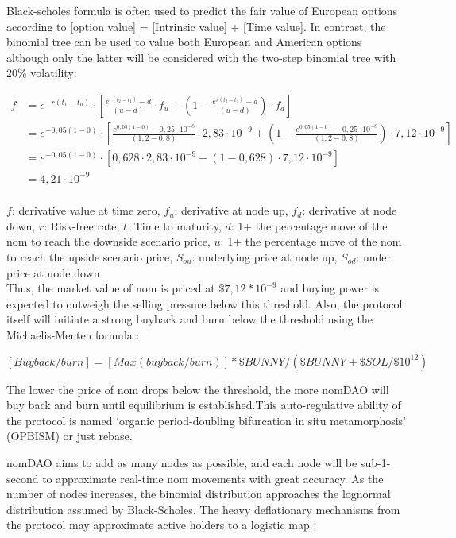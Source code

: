 \documentclass[12pt]{article}
\begin{document}
Black-scholes formula \cite{bscholes} is often used to predict the fair value of European options according to [option value] = [Intrinsic value] + [Time value]. In contrast, the binomial tree can be used to value both European and American options although only the latter will be considered with the two-step binomial tree with 20\% volatility:


\begin{equation}\label{black}
\begin{split}
f &=e^{-r(t_{1} -t_{0})} \cdot [\frac{e^{r(t_{2} - t_{1})}-d}{(u-d)} \cdot f_{u} + (1-\frac{e^{r(t_{2} - t_{1})}-d}{(u-d)}) \cdot f_{d}]\\
 &= e^{-0,05(1 - 0)} \cdot [\frac{e^{0,05(1 - 0)}-0,25\cdot10^{-8}}{(1,2-0,8)} \cdot 2,83\cdot10^{-9} + (1-\frac{e^{0,05(1 - 0)}-0,25\cdot10^{-8}}{(1,2-0,8)}) \cdot 7,12\cdot10^{-9}]\\
  &=e^{-0,05(1 - 0)} \cdot [0,628 \cdot 2,83\cdot10^{-9} + (1-0,628) \cdot 7,12\cdot10^{-9}]\\
 &=4,21\cdot10^{-9}
\end{split}
\end{equation}
\\

$f$: derivative value at time zero,
$f_{u}$: derivative at node up,
$f_{d}$: derivative at node down,
$r$: Risk-free rate,
$t$: Time to maturity,
$d$: 1+ the percentage move of the nom to reach the downside scenario price,
$u$:  1+ the percentage move of the nom to reach the upside scenario price,
$S_{ou}$: underlying price at node up,
$S_{od}$: under price at node down\\

Thus, the market value of nom is priced at $\$7,12*10^{-9}$ and buying power is expected to outweigh the selling pressure below this threshold. Also, the protocol itself will initiate a strong buyback and burn below the threshold using the Michaelis-Menten formula \cite{mm}:

\begin{equation}\label{mm}
[Buyback/burn]=[Max (buyback/burn)] * \$BUNNY/ (\$BUNNY+ \$SOL/\$10^{12})
\end{equation}\label{mm}

The lower the price of nom drops below the threshold, the more nomDAO will buy back and burn until equilibrium is established.This auto-regulative ability of the protocol is named ‘organic period-doubling bifurcation in situ metamorphosis’ (OPBISM) or just rebase.

nomDAO aims to add as many nodes as possible, and each node will be sub-1-second to approximate real-time nom movements with great accuracy. As the number of nodes increases, the binomial distribution approaches the lognormal distribution assumed by Black-Scholes. The heavy deflationary mechanisms from the protocol may approximate active holders to a logistic map \cite{logmap}:
\end{document}
